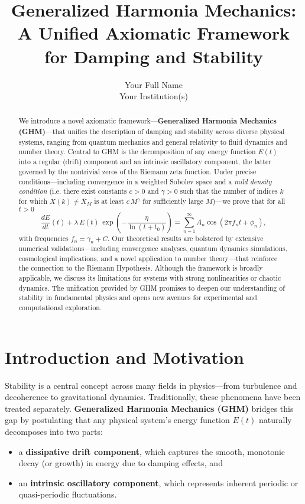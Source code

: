 \documentclass[11pt]{article}
\title{Generalized Harmonia Mechanics: \\ A Unified Axiomatic Framework for Damping and Stability}
\author{Your Full Name\\ Your Institution(s)}
\date{}
\begin{document}
\maketitle

\begin{abstract}
We introduce a novel axiomatic framework---\textbf{Generalized Harmonia Mechanics (GHM)}---that unifies the description of damping and stability across diverse physical systems, ranging from quantum mechanics and general relativity to fluid dynamics and number theory. Central to GHM is the decomposition of any energy function $E(t)$ into a regular (drift) component and an intrinsic oscillatory component, the latter governed by the nontrivial zeros of the Riemann zeta function. Under precise conditions---including convergence in a weighted Sobolev space and a \emph{mild density condition} (i.e. there exist constants $c>0$ and $\gamma>0$ such that the number of indices $k$ for which $X(k) \neq \overline{X}_M$ is at least $c\,M^{\gamma}$ for sufficiently large $M$)---we prove that for all $t>0$
\[
\frac{dE}{dt}(t) + \lambda\,E(t)\,\exp\left(-\frac{\eta}{\ln(t+t_{0})}\right) = \sum_{n=1}^{\infty} A_{n}\cos\left(2\pi f_{n}t+\phi_{n}\right),
\]
with frequencies $f_{n}=\gamma_{n}+C$. Our theoretical results are bolstered by extensive numerical validations---including convergence analyses, quantum dynamics simulations, cosmological implications, and a novel application to number theory---that reinforce the connection to the Riemann Hypothesis. Although the framework is broadly applicable, we discuss its limitations for systems with strong nonlinearities or chaotic dynamics. The unification provided by GHM promises to deepen our understanding of stability in fundamental physics and opens new avenues for experimental and computational exploration.
\end{abstract}

\section{Introduction and Motivation}

Stability is a central concept across many fields in physics---from turbulence and decoherence to gravitational dynamics. Traditionally, these phenomena have been treated separately. \textbf{Generalized Harmonia Mechanics (GHM)} bridges this gap by postulating that any physical system's energy function $E(t)$ naturally decomposes into two parts:
\begin{itemize}
    \item a \textbf{dissipative drift component}, which captures the smooth, monotonic decay (or growth) in energy due to damping effects, and
    \item an \textbf{intrinsic oscillatory component}, which represents inherent periodic or quasi-periodic fluctuations.
\end{itemize}
\end{document}

